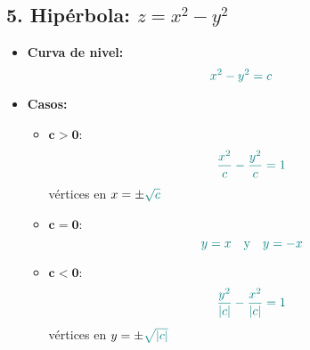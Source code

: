 \documentclass{article}
\begin{document}
\subsection*{5. Hipérbola: \(z = x^2 - y^2\)}
\begin{itemize}
    \item \textbf{Curva de nivel:} \[
    \color{teal} x^2 - y^2 = c
    \]
    \item \textbf{Casos:}
    \begin{itemize}
        \item \(\mathbf{c > 0}\): \[
        \color{teal} \frac{x^2}{c} - \frac{y^2}{c} = 1
        \]
        vértices en \(x = \pm\color{teal} \sqrt{c}\)

        \item \(\mathbf{c = 0}\): \[
        \color{teal} y = x \quad \text{y} \quad y = -x
        \]

        \item \(\mathbf{c < 0}\): \[
        \color{teal} \frac{y^2}{|c|} - \frac{x^2}{|c|} = 1
        \]
        vértices en \(y = \pm\color{teal} \sqrt{|c|}\)
    \end{itemize}
\end{itemize}
\end{document}
